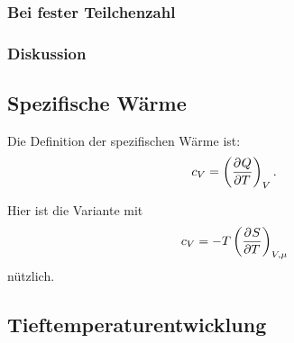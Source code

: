 \fehlt

\subsubsection{Bei fester Teilchenzahl}

\fehlt

\subsubsection{Diskussion}

\fehlt

\subsection{Spezifische Wärme}

Die Definition der spezifischen Wärme ist:
\[
    c_V = \tdpd QTV.
\]

Hier ist die Variante mit
\[
    c_V = - T \tdpd ST{V,\mu}
\]
nützlich.

\subsection{Tieftemperaturentwicklung}

\fehlt

\IfFileExists{\bibliographyfile}{
    \printbibliography
}{}



